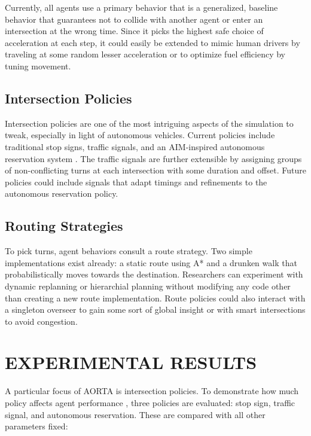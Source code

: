 \documentclass[letterpaper, 10 pt, conference]{ieeeconf}  %
\begin{document}
Currently, all agents use a primary behavior that is a generalized, baseline
behavior that guarantees not to collide with another agent or enter an
intersection at the wrong time. Since it picks the highest safe choice of
acceleration at each step, it could easily be extended to mimic human drivers by
traveling at some random lesser acceleration or to optimize fuel efficiency
by tuning movement.

\subsection{Intersection Policies}

Intersection policies are one of the most intriguing aspects of the simulation
to tweak, especially in light of autonomous vehicles. Current policies include
traditional stop signs, traffic signals, and an AIM-inspired autonomous
reservation system \cite{JAIR08-dresner}. The traffic signals are further
extensible by assigning groups of non-conflicting turns at each intersection
with some duration and offset. Future policies could include signals that adapt
timings and refinements to the autonomous reservation policy.

\subsection{Routing Strategies}

To pick turns, agent behaviors consult a route strategy. Two simple
implementations exist already: a static route using A* \cite{astar} and a
drunken walk that probabilistically moves towards the destination.  Researchers
can experiment with dynamic replanning or hierarchial planning without modifying
any code other than creating a new route implementation. Route policies could
also interact with a singleton overseer to gain some sort of global insight or
with smart intersections to avoid congestion.


\section{EXPERIMENTAL RESULTS}
\label{sec:results}

A particular focus of AORTA is intersection policies. To demonstrate how much
policy affects agent performance , three policies are evaluated: stop sign,
traffic signal, and autonomous reservation. These are compared with all other
parameters fixed:
\end{document}
